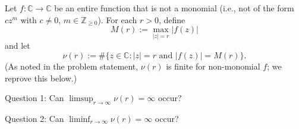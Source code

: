 Let \(f:\mathbb{C}\to\mathbb{C}\) be an entire function that is not a monomial (i.e., not of the form \(c z^m\) with \(c\ne 0\), \(m\in\mathbb{Z}_{\ge 0}\)). For each \(r>0\), define
\[
M(r):=\max_{|z|=r} |f(z)|
\]
and let
\[
\nu(r):=\#\{z\in\mathbb{C}: |z|=r\text{ and }|f(z)|=M(r)\}.
\]
(As noted in the problem statement, \(\nu(r)\) is finite for non-monomial \(f\); we reprove this below.)

Question 1: Can \(\limsup_{r\to\infty} \nu(r)=\infty\) occur?

Question 2: Can \(\liminf_{r\to\infty} \nu(r)=\infty\) occur?
